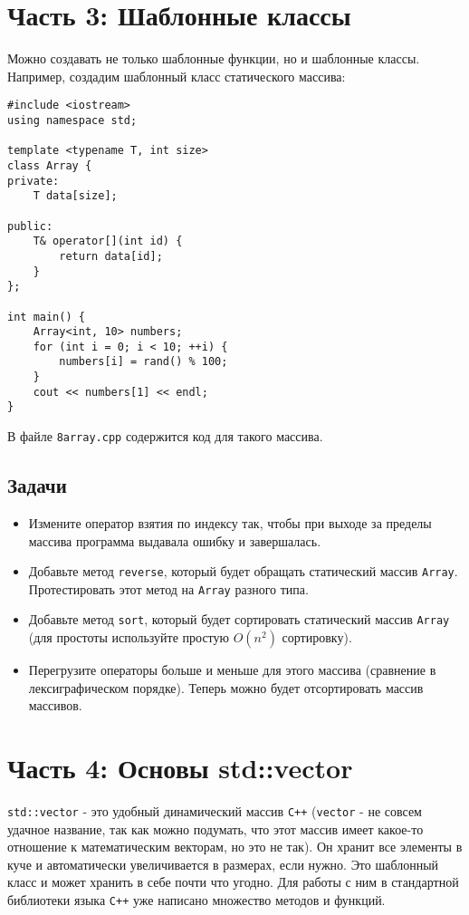 \documentclass{article}
\begin{document}
\section*{Часть 3: Шаблонные классы}
Можно создавать не только шаблонные функции, но и шаблонные классы. Например, создадим шаблонный класс статического массива:
\begin{lstlisting}
#include <iostream>
using namespace std;

template <typename T, int size>
class Array {
private:
    T data[size];

public:
    T& operator[](int id) {
        return data[id];
    }
};

int main() {
    Array<int, 10> numbers;
    for (int i = 0; i < 10; ++i) {
        numbers[i] = rand() % 100;
    }
    cout << numbers[1] << endl;
}
\end{lstlisting}

В файле \texttt{8array.cpp} содержится код для такого массива.
\subsection*{Задачи}
\begin{itemize}
\item Измените оператор взятия по индексу так, чтобы при выходе за пределы массива программа выдавала ошибку и завершалась.
\item Добавьте метод \texttt{reverse}, который будет обращать статический массив \texttt{Array}. Протестировать этот метод на \texttt{Array} разного типа.
\item Добавьте метод \texttt{sort}, который будет сортировать статический массив \texttt{Array} (для простоты используйте простую $O(n^2)$ сортировку).
\item Перегрузите операторы больше и меньше для этого массива (сравнение в лексиграфическом порядке). Теперь можно будет отсортировать массив массивов.

\end{itemize}


\newpage
\section*{Часть 4: Основы std::vector}
\texttt{std::vector} - это удобный динамический массив \texttt{C++} (\texttt{vector} - не совсем удачное название, так как можно подумать, что этот массив имеет какое-то отношение к математическим векторам, но это не так). Он хранит все элементы в куче и автоматически увеличивается в размерах, если нужно. Это шаблонный класс и может хранить в себе почти что угодно. Для работы с ним в стандартной библиотеки языка \texttt{C++} уже написано множество методов и функций.\\
\end{document}
